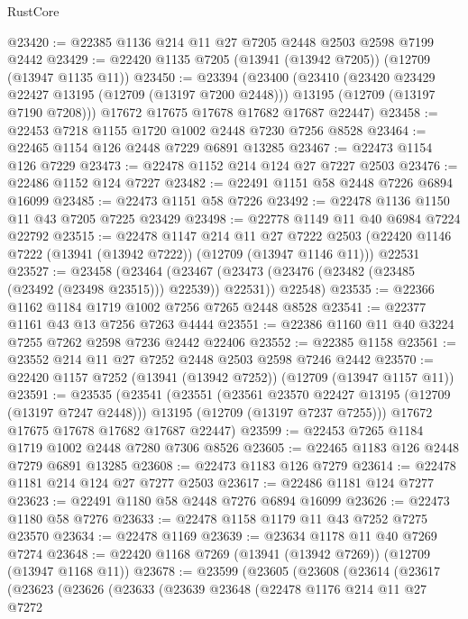 \begin{lexlean}{RustCore}
\begin{coremodule}
@23420 := @22385 @1136 @214 @11 @27 @7205 @2448 @2503 @2598 @7199 @2442
@23429 := @22420 @1135 @7205 (@13941 (@13942 @7205)) (@12709 (@13947 @1135 @11))
@23450 := @23394
    (@23400
      (@23410
        (@23420 @23429 @22427 @13195 (@12709 (@13197 @7200 @2448)))
        @13195
        (@12709 (@13197 @7190 @7208)))
      @17672
      @17675
      @17678
      @17682
      @17687
      @22447)
@23458 := @22453 @7218 @1155 @1720 @1002 @2448 @7230 @7256 @8528
@23464 := @22465 @1154 @126 @2448 @7229 @6891 @13285
@23467 := @22473 @1154 @126 @7229
@23473 := @22478 @1152 @214 @124 @27 @7227 @2503
@23476 := @22486 @1152 @124 @7227
@23482 := @22491 @1151 @58 @2448 @7226 @6894 @16099
@23485 := @22473 @1151 @58 @7226
@23492 := @22478 @1136 @1150 @11 @43 @7205 @7225 @23429
@23498 := @22778 @1149 @11 @40 @6984 @7224 @22792
@23515 := @22478
    @1147
    @214
    @11
    @27
    @7222
    @2503
    (@22420 @1146 @7222 (@13941 (@13942 @7222)) (@12709 (@13947 @1146 @11)))
    @22531
@23527 := @23458
    (@23464
      (@23467 (@23473 (@23476 (@23482 (@23485 (@23492 (@23498 @23515))) @22539)) @22531))
      @22548)
@23535 := @22366 @1162 @1184 @1719 @1002 @7256 @7265 @2448 @8528
@23541 := @22377 @1161 @43 @13 @7256 @7263 @4444
@23551 := @22386 @1160 @11 @40 @3224 @7255 @7262 @2598 @7236 @2442 @22406
@23552 := @22385 @1158
@23561 := @23552 @214 @11 @27 @7252 @2448 @2503 @2598 @7246 @2442
@23570 := @22420 @1157 @7252 (@13941 (@13942 @7252)) (@12709 (@13947 @1157 @11))
@23591 := @23535
    (@23541
      (@23551
        (@23561 @23570 @22427 @13195 (@12709 (@13197 @7247 @2448)))
        @13195
        (@12709 (@13197 @7237 @7255)))
      @17672
      @17675
      @17678
      @17682
      @17687
      @22447)
@23599 := @22453 @7265 @1184 @1719 @1002 @2448 @7280 @7306 @8526
@23605 := @22465 @1183 @126 @2448 @7279 @6891 @13285
@23608 := @22473 @1183 @126 @7279
@23614 := @22478 @1181 @214 @124 @27 @7277 @2503
@23617 := @22486 @1181 @124 @7277
@23623 := @22491 @1180 @58 @2448 @7276 @6894 @16099
@23626 := @22473 @1180 @58 @7276
@23633 := @22478 @1158 @1179 @11 @43 @7252 @7275 @23570
@23634 := @22478 @1169
@23639 := @23634 @1178 @11 @40 @7269 @7274
@23648 := @22420 @1168 @7269 (@13941 (@13942 @7269)) (@12709 (@13947 @1168 @11))
@23678 := @23599
    (@23605
      (@23608
        (@23614
          (@23617
            (@23623
              (@23626
                (@23633
                  (@23639
                    @23648
                    (@22478
                      @1176
                      @214
                      @11
                      @27
                      @7272

\end{coremodule}
\end{lexlean}
